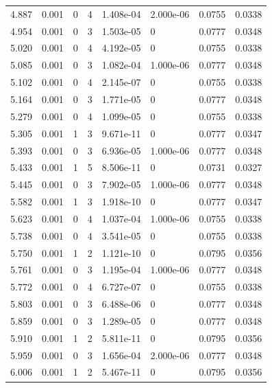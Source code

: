 \documentclass[preview]{standalone}
\begin{document}
{{{\begin{tabular}{L{1.2cm}C{1.2cm} C{0.3cm}C{0.5cm} C{1.4cm}C{1.4cm} C{1.4cm}C{1.4cm}}
  4.887  &  0.001  & 0     &  4 &  1.408e-04  & 2.000e-06  & 0.0755 &  0.0338   \\ 
  4.954  &  0.001  & 0     &  3 &  1.503e-05  & 0  & 0.0777 &  0.0348   \\ 
  5.020  &  0.001  & 0     &  4 &  4.192e-05  & 0  & 0.0755 &  0.0338   \\ 
  5.085  &  0.001  & 0     &  3 &  1.082e-04  & 1.000e-06  & 0.0777 &  0.0348   \\ 
  5.102  &  0.001  & 0     &  4 &  2.145e-07  & 0  & 0.0755 &  0.0338   \\ 
  5.164  &  0.001  & 0     &  3 &  1.771e-05  & 0  & 0.0777 &  0.0348   \\ 
  5.279  &  0.001  & 0     &  4 &  1.099e-05  & 0  & 0.0755 &  0.0338   \\ 
  5.305  &  0.001  & 1     &  3 &  9.671e-11  & 0  & 0.0777 &  0.0347   \\ 
  5.393  &  0.001  & 0     &  3 &  6.936e-05  & 1.000e-06  & 0.0777 &  0.0348   \\ 
  5.433  &  0.001  & 1     &  5 &  8.506e-11  & 0  & 0.0731 &  0.0327   \\ 
  5.445  &  0.001  & 0     &  3 &  7.902e-05  & 1.000e-06  & 0.0777 &  0.0348   \\ 
  5.582  &  0.001  & 1     &  3 &  1.918e-10  & 0  & 0.0777 &  0.0347   \\ 
  5.623  &  0.001  & 0     &  4 &  1.037e-04  & 1.000e-06  & 0.0755 &  0.0338   \\ 
  5.738  &  0.001  & 0     &  4 &  3.541e-05  & 0  & 0.0755 &  0.0338   \\ 
  5.750  &  0.001  & 1     &  2 &  1.121e-10  & 0  & 0.0795 &  0.0356   \\ 
  5.761  &  0.001  & 0     &  3 &  1.195e-04  & 1.000e-06  & 0.0777 &  0.0348   \\ 
  5.772  &  0.001  & 0     &  4 &  6.727e-07  & 0  & 0.0755 &  0.0338   \\ 
  5.803  &  0.001  & 0     &  3 &  6.488e-06  & 0  & 0.0777 &  0.0348   \\ 
  5.859  &  0.001  & 0     &  3 &  1.289e-05  & 0  & 0.0777 &  0.0348   \\ 
  5.910  &  0.001  & 1     &  2 &  5.811e-11  & 0  & 0.0795 &  0.0356   \\ 
  5.959  &  0.001  & 0     &  3 &  1.656e-04  & 2.000e-06  & 0.0777 &  0.0348   \\ 
  6.006  &  0.001  & 1     &  2 &  5.467e-11  & 0  & 0.0795 &  0.0356   \\ 

\end{tabular}}}}
\end{document}
